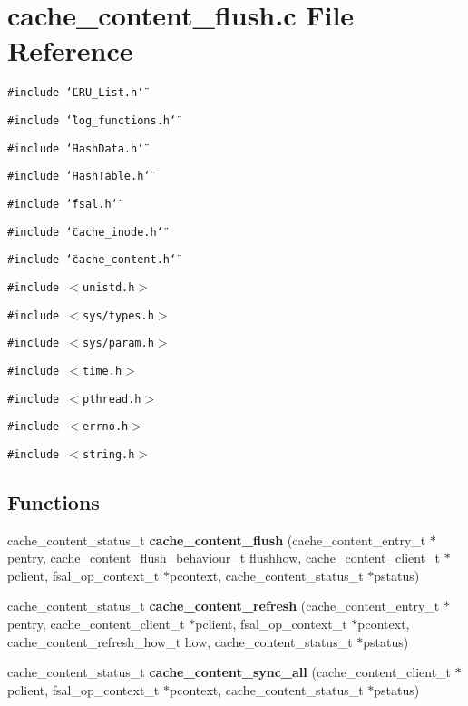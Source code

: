 \section{cache\_\-content\_\-flush.c File Reference}
\label{cache__content__flush_8c}
{\tt \#include \char`\"{}LRU\_\-List.h\char`\"{}}\par
{\tt \#include \char`\"{}log\_\-functions.h\char`\"{}}\par
{\tt \#include \char`\"{}Hash\-Data.h\char`\"{}}\par
{\tt \#include \char`\"{}Hash\-Table.h\char`\"{}}\par
{\tt \#include \char`\"{}fsal.h\char`\"{}}\par
{\tt \#include \char`\"{}cache\_\-inode.h\char`\"{}}\par
{\tt \#include \char`\"{}cache\_\-content.h\char`\"{}}\par
{\tt \#include $<$unistd.h$>$}\par
{\tt \#include $<$sys/types.h$>$}\par
{\tt \#include $<$sys/param.h$>$}\par
{\tt \#include $<$time.h$>$}\par
{\tt \#include $<$pthread.h$>$}\par
{\tt \#include $<$errno.h$>$}\par
{\tt \#include $<$string.h$>$}\par
\subsection*{Functions}
\begin{CompactItemize}
\item 
cache\_\-content\_\-status\_\-t {\bf cache\_\-content\_\-flush} (cache\_\-content\_\-entry\_\-t $\ast$pentry, cache\_\-content\_\-flush\_\-behaviour\_\-t flushhow, cache\_\-content\_\-client\_\-t $\ast$pclient, fsal\_\-op\_\-context\_\-t $\ast$pcontext, cache\_\-content\_\-status\_\-t $\ast$pstatus)
\item 
cache\_\-content\_\-status\_\-t {\bf cache\_\-content\_\-refresh} (cache\_\-content\_\-entry\_\-t $\ast$pentry, cache\_\-content\_\-client\_\-t $\ast$pclient, fsal\_\-op\_\-context\_\-t $\ast$pcontext, cache\_\-content\_\-refresh\_\-how\_\-t how, cache\_\-content\_\-status\_\-t $\ast$pstatus)
\item 
cache\_\-content\_\-status\_\-t {\bf cache\_\-content\_\-sync\_\-all} (cache\_\-content\_\-client\_\-t $\ast$pclient, fsal\_\-op\_\-context\_\-t $\ast$pcontext, cache\_\-content\_\-status\_\-t $\ast$pstatus)
\end{CompactItemize}


